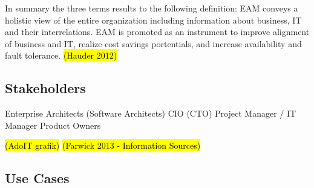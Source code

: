 In summary the three terms results to the following definition: EAM conveys a holistic view of the entire organization including information about business, IT and their interrelations.
EAM is promoted as an instrument to improve alignment of business and IT, realize cost savings portentials, and increase availability and fault tolerance.
\hl{(Hauder 2012)}


\subsection{Stakeholders}
Enterprise Architects (Software Architects)
CIO (CTO)
Project Manager / IT Manager
Product Owners

\hl{(AdoIT grafik)}
\hl{(Farwick 2013 - Information Sources)}

\subsection{Use Cases}


